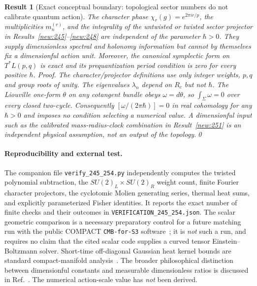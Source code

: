 \documentclass[aps,prd,onecolumn,notitlepage,groupedaddress,11pt]{revtex4-2}
\newtheorem{result}{Result}
\begin{document}
\begin{result}[\textsf{Exact conceptual boundary}: topological sector numbers do not calibrate quantum action]\label{new:254}
The character phase $\chi_r(g)=e^{2\pi ir/p}$, the multiplicities $m_n^{(r)}$, and the integrality of the untwisted or twisted sector projector in Results~\ref{new:245}--\ref{new:248} are independent of the parameter $\hbar>0$. They supply dimensionless spectral and holonomy information but cannot by themselves fix a dimensionful action unit. Moreover, the canonical symplectic form on $T^*L(p,q)$ is exact and its prequantization period condition is zero for \emph{every} positive $\hbar$.
\textit{Proof.} The character/projector definitions use only integer weights, $p,q$ and group roots of unity. The eigenvalues $\lambda_n$ depend on $R_c$ but not $\hbar$. The Liouville one-form $\theta$ on any cotangent bundle obeys $\omega=d\theta$, so $\int_\Sigma\omega=0$ over every closed two-cycle. Consequently $[\omega/(2\pi\hbar)]=0$ in real cohomology for any $\hbar>0$ and imposes no condition selecting a numerical value. A dimensionful input such as the calibrated mass-radius-clock combination in Result~\ref{new:251} is an \emph{independent physical assumption}, not an output of the topology.\qed
\end{result}

\paragraph{Reproducibility and external test.} The companion file \texttt{verify\_245\_254.py} independently computes the twisted polynomial subtraction, the $SU(2)_L\times SU(2)_R$ weight count, finite Fourier character projectors, the cyclotomic Molien generating series, thermal heat sums, and explicitly parameterized Fisher identities. It reports the exact number of finite checks and their outcomes in \texttt{VERIFICATION\_245\_254.json}. The scalar geometric comparison is a necessary preparatory control for a future matching run with the public COMPACT \texttt{CMB-for-S3} software~\cite{COMPACT2026Modes,COMPACTCode}; it is \emph{not} such a run, and requires no claim that the cited scalar code supplies a curved tensor Einstein--Boltzmann solver. Short-time off-diagonal Gaussian heat kernel bounds are standard compact-manifold analysis~\cite{GrigoryanHeat}. The broader philosophical distinction between dimensionful constants and measurable dimensionless ratios is discussed in Ref.~\cite{DuffOkunVeneziano}. The numerical action-scale value has \emph{not} been derived.
\end{document}
